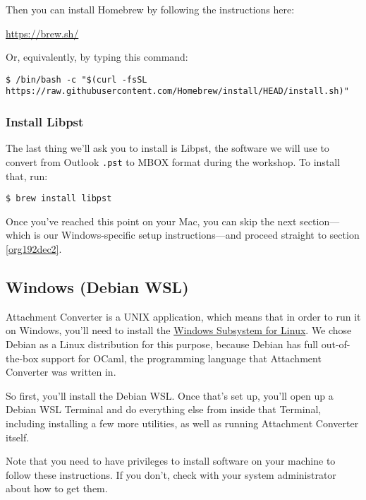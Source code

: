 \documentclass[11pt]{article}
\begin{document}
Then you can install Homebrew by following the instructions here:

\url{https://brew.sh/}

Or, equivalently, by typing this command:

\footnotesize

\begin{verbatim}
$ /bin/bash -c "$(curl -fsSL https://raw.githubusercontent.com/Homebrew/install/HEAD/install.sh)"
\end{verbatim}

\normalsize

\subsubsection{Install Libpst}
\label{sec:org31c60ce}

The last thing we'll ask you to install is Libpst, the software we
will use to convert from Outlook \texttt{.pst} to MBOX format during the
workshop.  To install that, run:

\begin{verbatim}
$ brew install libpst
\end{verbatim}

Once you've reached this point on your Mac, you can skip the next
section---which is our Windows-specific setup instructions---and
proceed straight to section \ref{org192dec2}.

\subsection{Windows (Debian WSL) \label{org849568b}}
\label{sec:orgd355c92}

Attachment Converter is a UNIX application, which means that in order
to run it on Windows, you'll need to install the \href{https://en.wikipedia.org/wiki/Windows\_Subsystem\_for\_Linux}{Windows Subsystem for
Linux}.  We chose Debian as a Linux distribution for this purpose,
because Debian has full out-of-the-box support for OCaml, the
programming language that Attachment Converter was written in.

So first, you'll install the Debian WSL.  Once that's set up, you'll
open up a Debian WSL Terminal and do everything else from inside that
Terminal, including installing a few more utilities, as well as
running Attachment Converter itself.

Note that you need to have privileges to install software on your
machine to follow these instructions.  If you don't, check with your
system administrator about how to get them.
\end{document}
